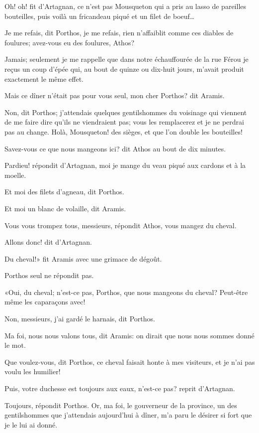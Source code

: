 \speak  Oh! oh! fit d'Artagnan, ce n'est pas Mousqueton qui a pris au lasso de pareilles bouteilles, puis voilà un fricandeau piqué et un filet de boeuf\dots 

\speak  Je me refais, dit Porthos, je me refais, rien n'affaiblit comme ces diables de foulures; avez-vous eu des foulures, Athos? 

\speak  Jamais; seulement je me rappelle que dans notre échauffourée de la rue Férou je reçus un coup d'épée qui, au bout de quinze ou dix-huit jours, m'avait produit exactement le même effet. 

\speak  Mais ce dîner n'était pas pour vous seul, mon cher Porthos? dit Aramis. 

\speak  Non, dit Porthos; j'attendais quelques gentilshommes du voisinage qui viennent de me faire dire qu'ils ne viendraient pas; vous les remplacerez et je ne perdrai pas au change. Holà, Mousqueton! des sièges, et que l'on double les bouteilles! 

\speak  Savez-vous ce que nous mangeons ici? dit Athos au bout de dix minutes. 

\speak  Pardieu! répondit d'Artagnan, moi je mange du veau piqué aux cardons et à la moelle. 

\speak  Et moi des filets d'agneau, dit Porthos. 

\speak  Et moi un blanc de volaille, dit Aramis. 

\speak  Vous vous trompez tous, messieurs, répondit Athos, vous mangez du cheval. 

\speak  Allons donc! dit d'Artagnan. 

\speak  Du cheval!» fit Aramis avec une grimace de dégoût. 

Porthos seul ne répondit pas. 

«Oui, du cheval; n'est-ce pas, Porthos, que nous mangeons du cheval? Peut-être même les caparaçons avec! 

\speak  Non, messieurs, j'ai gardé le harnais, dit Porthos. 

\speak  Ma foi, nous nous valons tous, dit Aramis: on dirait que nous nous sommes donné le mot. 

\speak  Que voulez-vous, dit Porthos, ce cheval faisait honte à mes visiteurs, et je n'ai pas voulu les humilier! 

\speak  Puis, votre duchesse est toujours aux eaux, n'est-ce pas? reprit d'Artagnan. 

\speak  Toujours, répondit Porthos. Or, ma foi, le gouverneur de la province, un des gentilshommes que j'attendais aujourd'hui à dîner, m'a paru le désirer si fort que je le lui ai donné. 

